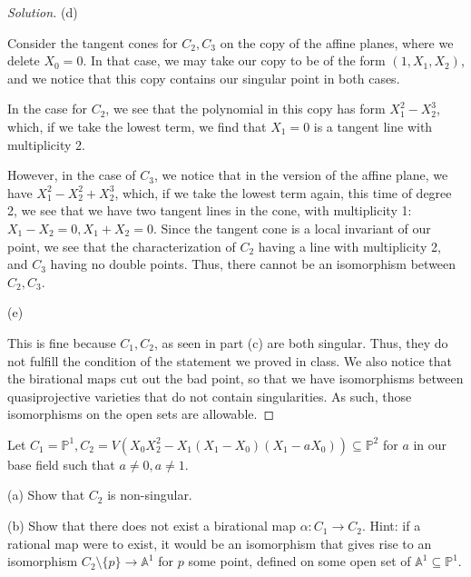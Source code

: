 \documentclass[10pt]{article}
\newenvironment{problem}[2][Problem]{\begin{trivlist}
\item[\hskip \labelsep {\bfseries #1}\hskip \labelsep {\bfseries #2.}]}{\end{trivlist}}
\begin{document}
\begin{proof}[Solution]
(d)

Consider the tangent cones for $C_2,C_3$ on the copy of the affine planes, where we delete $X_0 = 0$. In that case, we may take our copy to be of the form $(1,X_1,X_2)$, and we notice that this copy contains our singular point in both cases.

In the case for $C_2$, we see that the polynomial in this copy has form $X_1^2 - X_2^3$, which, if we take the lowest term, we find that $X_1 = 0$ is a tangent line with multiplicity 2.

However, in the case of $C_3$, we notice that in the version of the affine plane, we have $X_1^2  -X_2^2 + X_2^3$, which, if we take the lowest term again, this time of degree 2, we see that we have two tangent lines in the cone, with multiplicity 1: $X_1 - X_2 = 0, X_1 + X_2 = 0$. Since the tangent cone is a local invariant of our point, we see that the characterization of $C_2$ having a line with multiplicity 2, and $C_3$ having no double points. Thus, there cannot be an isomorphism between $C_2, C_3$.


(e)

This is fine because $C_1, C_2$, as seen in part (c) are both singular. Thus, they do not fulfill the condition of the statement we proved in class. We also notice that the birational maps cut out the bad point, so that we have isomorphisms between quasiprojective varieties that do not contain singularities. As such, those isomorphisms on the open sets are allowable.

\end{proof}

\begin{problem}{8.3}

Let $C_1 = \mathbb{P}^1, C_2 = V(X_0X_2^2 - X_1(X_1 - X_0)(X_1 - aX_0)) \subseteq \mathbb{P}^2$ for $a$ in our base field such that $a \not = 0, a \not = 1$.

(a) Show that $C_2$ is non-singular. 

(b) Show that there does not exist a birational map $\alpha: C_1 \to C_2$. Hint: if a rational map were to exist, it would be an isomorphism that gives rise to an isomorphism $C_2 \setminus \{ p \} \to \mathbb{A}^1$ for $p$ some point, defined on some open set of $\mathbb{A}^1 \subseteq \mathbb{P}^1$.

\end{problem}
\end{document}
